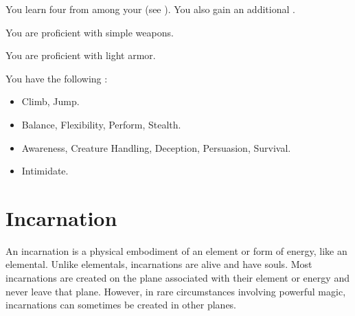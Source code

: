       You learn four  from among your  (see ). You also gain an additional .

      You are proficient with simple weapons.

      You are proficient with light armor.

      You have the following :
      \begin{itemize}
        \item {} Climb, Jump.
        \item {} Balance, Flexibility, Perform, Stealth.
        \item {} Awareness, Creature Handling, Deception, Persuasion, Survival.
        \item {} Intimidate.
      \end{itemize}

\section{Incarnation}

  An incarnation is a physical embodiment of an element or form of energy, like an elemental.
  Unlike elementals, incarnations are alive and have souls.
  Most incarnations are created on the plane associated with their element or energy and never leave that plane.
  However, in rare circumstances involving powerful magic, incarnations can sometimes be created in other planes.

